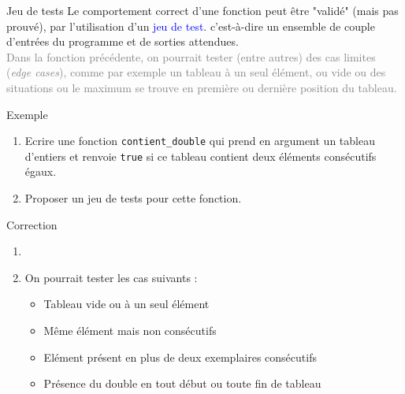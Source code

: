\documentclass[10pt]{beamer}
\begin{document}
\begin{frame}{\Ctitle}{\stitle}
	\begin{block}{Jeu de tests}
		\onslide<1->Le comportement correct d'une fonction peut être "validé" (mais pas prouvé), par l'utilisation d'un \textcolor{blue}{jeu de test}. c'est-à-dire un ensemble de couple d'entrées du programme et de sorties attendues. \\
		\onslide<2->\textcolor{gray}{Dans la fonction précédente, on pourrait tester (entre autres) des cas limites (\textit{edge cases}), comme par exemple un tableau à un seul élément, ou vide ou des situations ou le maximum se trouve en première ou dernière position du tableau.}
	\end{block}
	\begin{exampleblock}{Exemple}
		\begin{enumerate}
		\item<3-> Ecrire une fonction {\tt contient\_double} qui prend en argument un tableau d'entiers et renvoie {\tt true} si ce tableau contient deux éléments consécutifs égaux.
		\item<4-> Proposer un jeu de tests pour cette fonction.
		\end{enumerate}
	\end{exampleblock}
\end{frame}


\begin{frame}{\Ctitle}{\stitle}
	\begin{exampleblock}{Correction}
		\begin{enumerate}
		\item<1-> \ \\ 
		\item<2-> On pourrait tester les cas suivants :
		\begin{itemize}
			\item<3-> Tableau vide ou à un seul élément
			\item<4-> Même élément mais non consécutifs
			\item<5-> Elément présent en plus de deux exemplaires consécutifs
			\item<6-> Présence du double en tout début ou toute fin de tableau
		\end{itemize}
		\end{enumerate}
	\end{exampleblock}
\end{frame}
\end{document}
